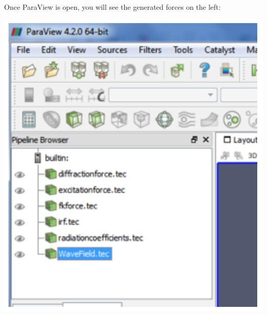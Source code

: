 \documentclass[12pt]{article}
\begin{document}
Once ParaView is open, you will see the generated forces on the left:

\vspace{\abovedisplayskip}
\begin{minipage}{\linewidth}
	\centering
	\includegraphics[scale=0.7]{img/56}
\end{minipage}
\vspace{\belowdisplayskip}
\end{document}
